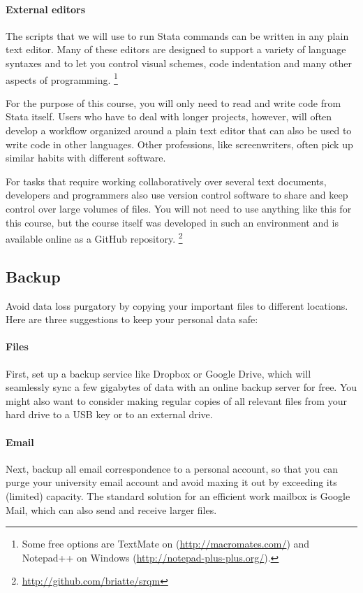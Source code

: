 \paragraph{External editors}%
%
The scripts that we will use to run Stata commands can be written in any plain text editor. Many of these editors are designed to support a variety of language syntaxes and to let you control visual schemes, code indentation and many other aspects of programming.%
  \footnote{Some free options are TextMate on \OSX (\url{http://macromates.com/}) and Notepad++ on Windows (\url{http://notepad-plus-plus.org/}).}%

For the purpose of this course, you will only need to read and write code from Stata itself. Users who have to deal with longer projects, however, will often develop a workflow organized around a plain text editor that can also be used to write code in other languages. Other professions, like screenwriters, often pick up similar habits with different software.%

For tasks that require working collaboratively over several text documents, developers and programmers also use version control software to share and keep control over large volumes of files. You will not need to use anything like this for this course, but the course itself was developed in such an environment and is available online as a GitHub repository.%
  \footnote{\url{http://github.com/briatte/srqm}}%

%
%
\subsection{Backup}%
%
Avoid data loss purgatory by copying your important files to different locations. Here are three suggestions to keep your personal data safe:%

\paragraph{Files} %
First, set up a backup service like Dropbox or Google Drive, which will seamlessly sync a few gigabytes of data with an online backup server for free. You might also want to consider making regular copies of all relevant files from your hard drive to a USB key or to an external drive.%

\paragraph{Email} %
Next, backup all email correspondence to a personal account, so that you can purge your university email account and avoid maxing it out by exceeding its (limited) capacity. The standard solution for an efficient work mailbox is Google Mail, which can also send and receive larger files.%

